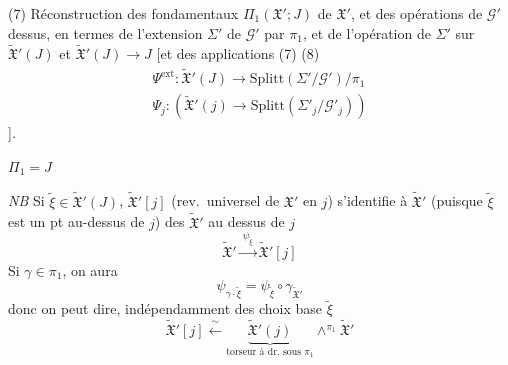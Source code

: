 \documentclass[11pt,a4paper]{article}
\begin{document}
(7) Réconstruction des  fondamentaux
$\Pi_1(\mathfrak{X}'; J)$ de $\mathfrak{X}'$, et des opérations de
$\mathcal{G}'$ dessus, en termes de l'extension $\Sigma'$ de $\mathcal{G}'$
par $\pi_1$, et de l'opération de $\Sigma'$ sur
$\widetilde{\mathfrak{X}}'(J)$ et $\widetilde{\mathfrak{X}}'(J) \to J$ [et des
applications (7) (8)
\[
  \begin{array}{l}
    \Psi^{\mathrm{ext}} : \widetilde{\mathfrak{X}}'(J) \longrightarrow
      \mathrm{Splitt}(\Sigma'/\mathcal{G}')/\pi_1 \\
    \Psi_j : (\widetilde{\mathfrak{X}}'(j) \longrightarrow
      \mathrm{Splitt}(\Sigma'_j/\mathcal{G}'_j))
  \end{array}
\]
].

 $\Pi_1 = J$

\emph{NB} Si $\widetilde{\xi} \in \widetilde{\mathfrak{X}}'(J)$,
$\widetilde{\mathfrak{X}}'[j]$ (rev.\ universel de $\mathfrak{X}'$ en $j$)
s'identifie à $\widetilde{\mathfrak{X}}'$ (puisque $\widetilde{\xi}$ est un
pt au-dessus de $j$) \ill{} des $\widetilde{\mathfrak{X}}'$ au dessus de $j$
\[
  \widetilde{\mathfrak{X}}' \xrightarrow{\ \psi_{\widetilde{\xi}}\ }
  \widetilde{\mathfrak{X}}'[j]
\]
Si $\gamma \in \pi_1$, on aura
\[
  \psi_{\gamma \cdot \widetilde{\xi}} = \psi_{\widetilde{\xi}} \circ
  \gamma_{\widetilde{\mathfrak{X}}'}
\]
donc on peut dire, indépendamment des choix  base
$\widetilde{\xi}$
\[
  \widetilde{\mathfrak{X}}'[j] \xleftarrow{\ \sim\ }
  \underbrace{\widetilde{\mathfrak{X}}'(j)}_{\text{torseur à dr.\ sous } \pi_1}
  \wedge^{\pi_1} \widetilde{\mathfrak{X}}'
\]
\end{document}
